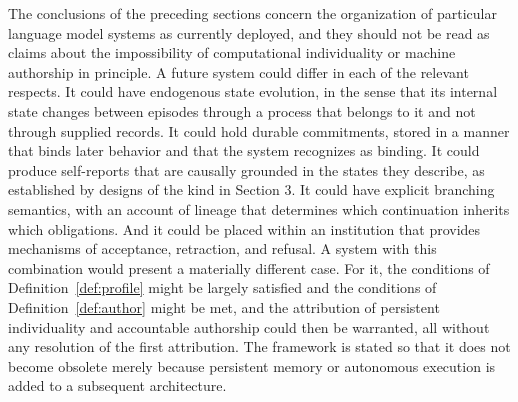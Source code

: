 \documentclass[12pt]{article}
\theoremstyle{definition}
\theoremstyle{plain}
\begin{document}
The conclusions of the preceding sections concern the organization of particular language model systems as currently deployed, and they should not be read as claims about the impossibility of computational individuality or machine authorship in principle. A future system could differ in each of the relevant respects. It could have endogenous state evolution, in the sense that its internal state changes between episodes through a process that belongs to it and not through supplied records. It could hold durable commitments, stored in a manner that binds later behavior and that the system recognizes as binding. It could produce self-reports that are causally grounded in the states they describe, as established by designs of the kind in Section 3. It could have explicit branching semantics, with an account of lineage that determines which continuation inherits which obligations. And it could be placed within an institution that provides mechanisms of acceptance, retraction, and refusal. A system with this combination would present a materially different case. For it, the conditions of Definition~\ref{def:profile} might be largely satisfied and the conditions of Definition~\ref{def:author} might be met, and the attribution of persistent individuality and accountable authorship could then be warranted, all without any resolution of the first attribution. The framework is stated so that it does not become obsolete merely because persistent memory or autonomous execution is added to a subsequent architecture.
\end{document}
